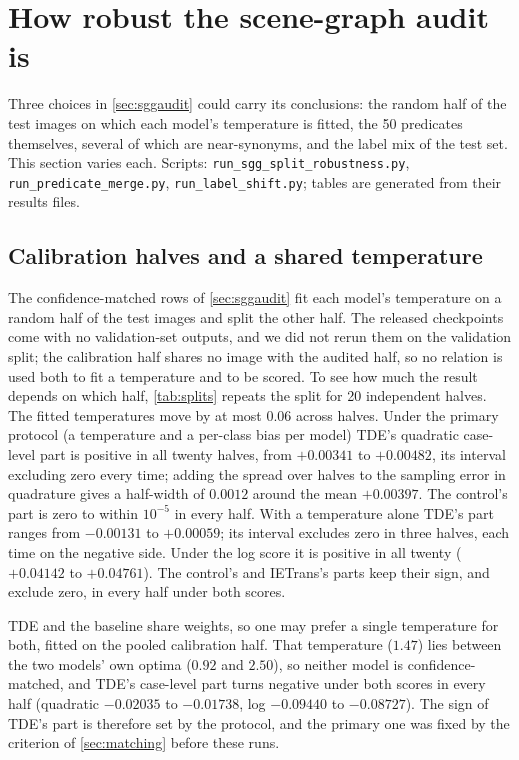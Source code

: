 \section{How robust the scene-graph audit is}\label{app:robust}

Three choices in \cref{sec:sggaudit} could carry its conclusions: the random half of the test
images on which each model's temperature is fitted, the 50 predicates themselves, several of
which are near-synonyms, and the label mix of the test set. This section varies each.
Scripts: \texttt{run\_sgg\_split\_robustness.py}, \texttt{run\_predicate\_merge.py},
\texttt{run\_label\_shift.py}; tables are generated from their results files.

\subsection{Calibration halves and a shared temperature}\label{app:splits}

The confidence-matched rows of \cref{sec:sggaudit} fit each model's temperature on a random
half of the test images and split the other half. The released checkpoints come with no
validation-set outputs, and we did not rerun them on the validation split; the calibration
half shares no image with the audited half, so no relation is used both to fit a temperature
and to be scored. To see how much the result depends on which half, \cref{tab:splits} repeats
the split for 20 independent halves. The fitted temperatures move by at most $0.06$ across
halves. Under the primary protocol (a temperature and a per-class bias per model) TDE's
quadratic case-level part is positive in all twenty halves, from $+0.00341$ to $+0.00482$, its
interval excluding zero every time; adding the spread over halves to the sampling error in
quadrature gives a half-width of $0.0012$ around the mean $+0.00397$. The control's part is
zero to within $10^{-5}$ in every half. With a temperature alone TDE's part ranges from
$-0.00131$ to $+0.00059$; its interval excludes zero in three halves, each time on the
negative side.
Under the log score it is positive in all twenty ($+0.04142$ to $+0.04761$). The control's and
IETrans's parts keep their sign, and exclude zero, in every half under both scores.

TDE and the baseline share weights, so one may prefer a single temperature for both, fitted on
the pooled calibration half. That temperature ($1.47$) lies between the two models' own optima
($0.92$ and $2.50$), so neither model is confidence-matched, and TDE's case-level part turns
negative under both scores in every half (quadratic $-0.02035$ to $-0.01738$, log $-0.09440$ to
$-0.08727$). The sign of TDE's part is therefore set by the protocol, and the primary one
was fixed by the criterion of \cref{sec:matching} before these runs.

